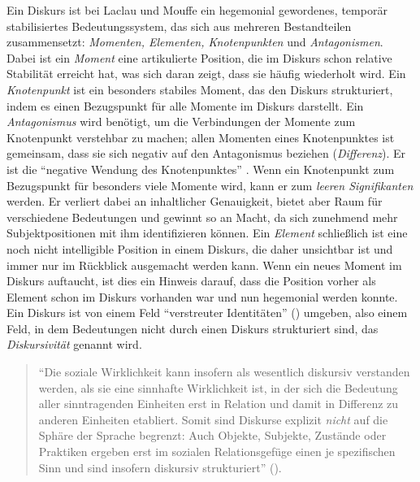 \documentclass[12pt, titlepage=true, toc=bib]{scrartcl}
\begin{document}
Ein Diskurs ist bei Laclau und Mouffe ein hegemonial gewordenes, temporär stabilisiertes Bedeutungssystem, das sich aus mehreren Bestandteilen zusammensetzt: \textit{Momenten, Elementen, Knotenpunkten} und \textit{Antagonismen}. Dabei ist ein \textit{Moment} eine artikulierte Position, die im Diskurs schon relative Stabilität erreicht hat, was sich daran zeigt, dass sie häufig wiederholt wird. Ein \textit{Knotenpunkt} ist ein besonders stabiles Moment, das den Diskurs strukturiert, indem es einen Bezugspunkt für alle Momente im Diskurs darstellt. Ein \textit{Antagonismus} wird benötigt, um die Verbindungen der Momente zum Knotenpunkt verstehbar zu machen; allen Momenten eines Knotenpunktes ist gemeinsam, dass sie sich negativ auf den Antagonismus beziehen (\textit{Differenz}). Er ist die "`negative Wendung des Knotenpunktes"' \cite[6]{bruell_chancen_2006}. Wenn ein Knotenpunkt zum Bezugspunkt für besonders viele Momente wird, kann er zum \textit{leeren Signifikanten} werden. Er verliert dabei an inhaltlicher Genauigkeit, bietet aber Raum für verschiedene Bedeutungen und gewinnt so an Macht, da sich zunehmend mehr Subjektpositionen mit ihm identifizieren können. Ein \textit{Element} schließlich ist eine noch nicht intelligible Position in einem Diskurs, die daher unsichtbar ist und immer nur im Rückblick ausgemacht werden kann. Wenn ein neues Moment im Diskurs auftaucht, ist dies ein Hinweis darauf, dass die Position vorher als Element schon im Diskurs vorhanden war und nun hegemonial werden konnte. Ein Diskurs ist von einem Feld "`verstreuter Identitäten"' (\cite[vgl.][6]{bruell_chancen_2006}) umgeben, also einem Feld, in dem Bedeutungen nicht durch einen Diskurs strukturiert sind, das \textit{Diskursivität} genannt wird. 

\begin{singlespace*}
\begin{quote}
"`Die soziale Wirklichkeit kann insofern als wesentlich diskursiv verstanden werden, als sie eine sinnhafte Wirklichkeit ist, in der sich die Bedeutung aller sinntragenden Einheiten erst in Relation und damit in Differenz zu anderen Einheiten etabliert. Somit sind Diskurse explizit \textit{nicht} auf die Sphäre der Sprache begrenzt: Auch Objekte, Subjekte, Zustände oder Praktiken ergeben erst im sozialen Relationsgefüge einen je spezifischen Sinn und sind insofern diskursiv strukturiert"' (\cite[9; Hervorh. im Orig.]{nonhoff_diskurs_2007-1}).
\end{quote}
\end{singlespace*}
\end{document}

